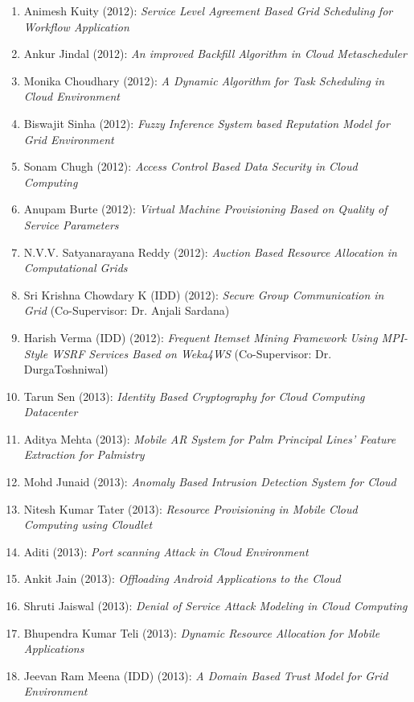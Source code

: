 \begin{enumerate}
\item	Animesh Kuity (2012): 	\textit{Service Level Agreement Based Grid Scheduling for Workflow Application}
\item	Ankur Jindal (2012): 	\textit{	An improved Backfill Algorithm in Cloud Metascheduler}
\item	Monika Choudhary (2012): 	\textit{	A Dynamic Algorithm for Task Scheduling in Cloud Environment}	
\item	Biswajit Sinha (2012): 	\textit{	Fuzzy Inference System based Reputation Model for Grid Environment} 
\item	Sonam Chugh (2012): 	\textit{	Access Control Based Data Security in Cloud Computing} 
\item	Anupam Burte (2012): 	\textit{	Virtual Machine Provisioning Based on Quality of Service Parameters}	
\item	N.V.V. Satyanarayana Reddy (2012): 	\textit{	Auction Based Resource Allocation in Computational Grids	} 
\item   Sri Krishna Chowdary K (IDD) (2012): 	\textit{	Secure Group Communication in Grid}  (Co-Supervisor: Dr. Anjali Sardana) 
\item	Harish Verma (IDD) (2012): 	\textit{	Frequent Itemset Mining Framework Using MPI-Style WSRF Services Based on Weka4WS} (Co-Supervisor: Dr. DurgaToshniwal)
\item	Tarun Sen (2013): 	\textit{	Identity Based Cryptography for Cloud Computing Datacenter}	 
\item	Aditya Mehta (2013): 	\textit{	Mobile AR System for Palm Principal Lines' Feature Extraction for Palmistry} 
\item		Mohd Junaid (2013): 	\textit{	Anomaly Based Intrusion Detection System for Cloud}	
\item		Nitesh Kumar Tater (2013): 	\textit{	Resource Provisioning in Mobile Cloud Computing using Cloudlet}
\item		Aditi (2013): 	\textit{	Port scanning Attack in Cloud Environment} 
\item		Ankit Jain (2013): 	\textit{	Offloading Android Applications to the Cloud}
\item		Shruti Jaiswal (2013): 	\textit{	Denial of Service Attack Modeling in Cloud Computing}
\item		Bhupendra Kumar Teli (2013): 	\textit{	Dynamic Resource Allocation for Mobile Applications}
\item		Jeevan Ram Meena (IDD) (2013): 	\textit{	A Domain Based Trust Model for Grid Environment}

\end{enumerate}
